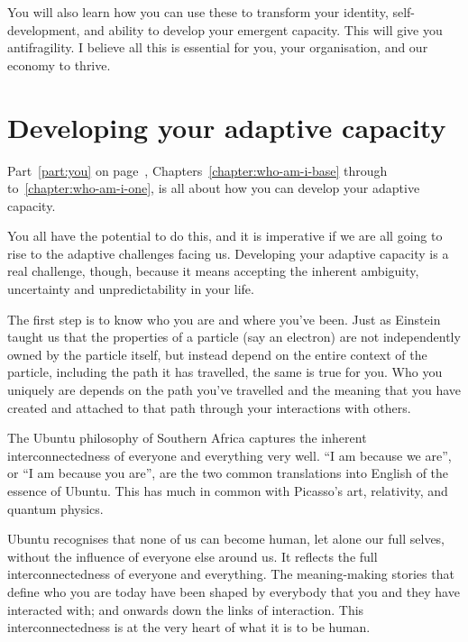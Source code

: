 You will also learn how you can use these to transform your identity, self-devel\-op\-ment, and ability to develop your emergent capacity. This will give you antifragility. I believe all this is essential for you, your organisation, and our economy to thrive.


\section{Developing your adaptive capacity}
\label{section:intro-your-ad-cap}


Part~\ref{part:you} on page~\pageref{part:you}, Chapters~\ref{chapter:who-am-i-base} through to~\ref{chapter:who-am-i-one}, is all about how you can develop your adaptive capacity. 


You all have the potential to do this, and it is imperative if we are all going to rise to the adaptive challenges facing us. Developing your adaptive capacity is a real challenge, though, because it means accepting the inherent ambiguity, uncertainty and unpredictability in your life.


The first step is to know who you are and where you've been. Just as Einstein taught us that the properties of a particle (say an electron) are not independently owned by the particle itself, but instead depend on the entire context of the particle, including the path it has travelled, the same is true for you. Who you uniquely are depends on the path you've travelled and the meaning that you have created and attached to that path through your interactions with others.


The Ubuntu philosophy of Southern Africa captures the inherent interconnectedness of everyone and everything very well. “I am because we are”, or “I am because you are”, are the two common translations into English of the essence of Ubuntu. This has much in common with Picasso's art, relativity, and quantum physics.


Ubuntu recognises that none of us can become human, let alone our full selves, without the influence of everyone else around us. It reflects the full interconnectedness of everyone and everything. The meaning\hyp{}making stories that define who you are today have been shaped by everybody that you and they have interacted with; and onwards down the links of interaction. This interconnectedness is at the very heart of what it is to be human.


